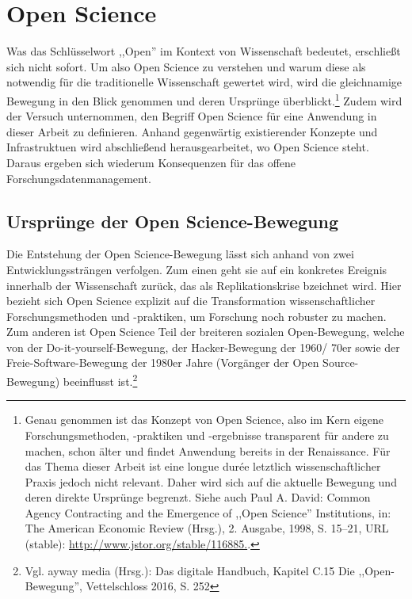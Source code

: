 \onehalfspacing

\section{Open Science}

Was das Schlüsselwort ,,Open'' im Kontext von Wissenschaft bedeutet, erschließt sich nicht sofort. Um also Open Science zu verstehen und warum diese als notwendig für die traditionelle Wissenschaft gewertet wird, wird die gleichnamige Bewegung in den Blick genommen und deren Ursprünge überblickt.\footnote{Genau genommen ist das Konzept von Open Science, also im Kern eigene Forschungsmethoden,  -praktiken und -ergebnisse transparent für andere zu machen, schon älter und findet Anwendung bereits in der Renaissance. Für das Thema dieser Arbeit ist eine longue durée letztlich wissenschaftlicher Praxis jedoch nicht relevant. Daher wird sich auf die aktuelle Bewegung und deren direkte Ursprünge begrenzt. Siehe auch Paul A. David: Common Agency Contracting and the Emergence of ,,Open Science'' Institutions, in: The American Economic Review (Hrsg.), 2. Ausgabe, 1998, S. 15–21, URL (stable): \url{http://www.jstor.org/stable/116885.}.} Zudem wird der Versuch unternommen, den Begriff Open Science für eine Anwendung in dieser Arbeit zu definieren. Anhand gegenwärtig existierender Konzepte und Infrastruktuen wird abschließend herausgearbeitet, wo Open Science steht. Daraus ergeben sich wiederum Konsequenzen für das offene Forschungsdatenmanagement. 

\subsection{Ursprünge der Open Science-Bewegung}

Die Entstehung der Open Science-Bewegung lässt sich anhand von zwei Entwicklungssträngen verfolgen. Zum einen geht sie auf ein konkretes Ereignis innerhalb der Wissenschaft zurück, das als Replikationskrise bzeichnet wird. Hier bezieht sich Open Science explizit auf die Transformation wissenschaftlicher Forschungsmethoden und -praktiken, um Forschung noch robuster zu machen. Zum anderen ist Open Science Teil der breiteren sozialen Open-Bewegung, welche von der Do-it-yourself-Bewegung, der Hacker-Bewegung der 1960/ 70er sowie der Freie-Software-Bewegung der 1980er Jahre
(Vorgänger der Open Source-Bewegung) beeinflusst ist.\footnote{Vgl. ayway media (Hrsg.): Das digitale Handbuch,
Kapitel C.15 Die ,,Open-Bewegung'', Vettelschloss 2016, S. 252}

